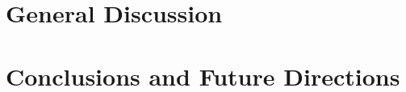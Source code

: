 \chapter{General Discussion}
\lipsum[10-15]

\chapter{Conclusions and Future Directions}
\lipsum[10-20]
